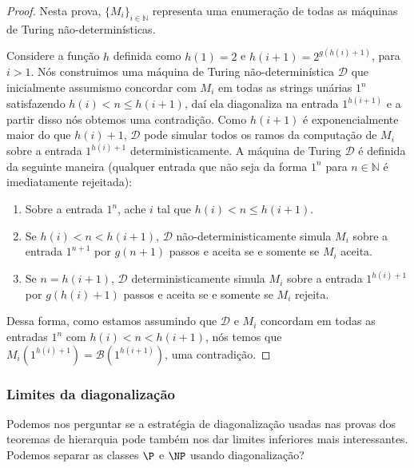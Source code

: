 \begin{proof}

Nesta prova, $\{M_{i}\}_{i \in \mathbb{N}}$ representa uma enumeração de todas as máquinas de Turing não-determinísticas.

Considere a função $h$ definida como $h(1) = 2$ e $h(i + 1) = 2^{g(h(i) + 1)}$, para $i > 1$. Nós construimos uma máquina de Turing não-determinística $\mathcal{D}$ que inicialmente assumismo concordar com $M_{i}$ em todas as strings unárias $1^{n}$ satisfazendo $h(i) < n \leq h(i + 1)$, daí ela diagonaliza na entrada $1^{h(i + 1)}$ e a partir disso nós obtemos uma contradição. Como $h(i + 1)$ é exponencialmente maior do que $h(i) + 1$, $\mathcal{D}$ pode simular todos os ramos da computação de $M_{i}$ sobre a entrada $1^{h(i) + 1}$ deterministicamente. A máquina de Turing $\mathcal{D}$ é definida da seguinte maneira (qualquer entrada que não seja da forma $1^{n}$ para $n \in \mathbb{N}$ é imediatamente rejeitada):

\begin{enumerate}

\item Sobre a entrada $1^{n}$, ache $i$ tal que $h(i) < n \leq h(i + 1)$.

\item Se $h(i) < n < h(i + 1)$, $\mathcal{D}$ não-deterministicamente simula $M_{i}$ sobre a entrada $1^{n + 1}$ por $g(n + 1)$ passos e aceita se e somente se $M_{i}$ aceita.

\item Se $n = h(i + 1)$, $\mathcal{D}$ deterministicamente simula $M_{i}$ sobre a entrada $1^{h(i) + 1}$ por $g(h(i) + 1)$ passos e aceita se e somente se $M_{i}$ rejeita.

\end{enumerate}

Dessa forma, como estamos assumindo que $\mathcal{D}$ e $M_{i}$ concordam em todas as entradas $1^{n}$ com $h(i) < n < h(i + 1)$, nós temos que $M_{i}(1^{h(i) + 1}) = \mathcal{B}(1^{h(i + 1)})$, uma contradição. 


\end{proof}

\subsubsection{Limites da diagonalização}

Podemos nos perguntar se a estratégia de diagonalização usadas nas provas dos teoremas de hierarquia pode também nos dar limites inferiores mais interessantes. Podemos separar as classes $\P$ e $\NP$ usando diagonalização?

